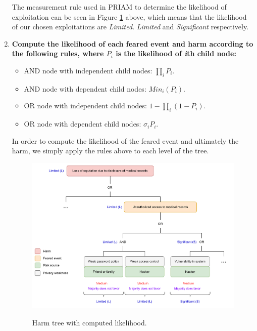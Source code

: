\begin{enumerate}
        The measurement rule used in PRIAM to determine the likelihood of
        exploitation can be seen in Figure \ref{fig:measurement} above, which means that
        the likelihood of our chosen exploitations are \textit{Limited}.
        \textit{Limited} and \textit{Significant} respectively.

  \item{\textbf{Compute the likelihood of each feared event and harm according to the following
        rules, where $P_i$ is the likelihood of \textit{i}th child node:}}
        \begin{itemize}
          \item AND node with independent child nodes: $\prod_{i}P_{i}$.
          \item AND node with dependent child nodes: $Min_{i}(P_{i})$.
          \item OR node with independent child nodes: $1-\prod_{i}(1-P_{i})$.
          \item OR node with dependent child nodes: $\sigma_{i}P_{i}$.
        \end{itemize}

        In order to compute the likelihood of the feared event and ultimately
        the harm, we simply apply the rules above to each level of the tree.

        \begin{figure}[hbt!]
          \centering
          \includegraphics[width=\textwidth]{pictures/harm_tree_wrl.png}
          \caption{}{Harm tree with computed likelihood.}
          \label{fig:measurement}
        \end{figure}
\end{enumerate}
